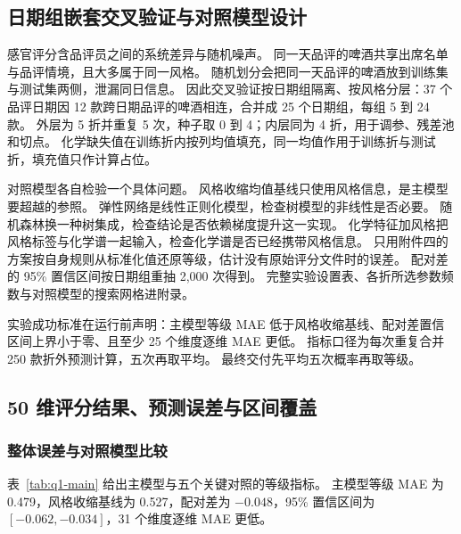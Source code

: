 \subsection{日期组嵌套交叉验证与对照模型设计}

感官评分含品评员之间的系统差异与随机噪声。
同一天品评的啤酒共享出席名单与品评情境，且大多属于同一风格。
随机划分会把同一天品评的啤酒放到训练集与测试集两侧，泄漏同日信息。
因此交叉验证按日期组隔离、按风格分层：37 个品评日期因 12 款跨日期品评的啤酒相连，合并成 25 个日期组，每组 5 到 24 款。
外层为 5 折并重复 5 次，种子取 0 到 4；内层同为 4 折，用于调参、残差池和切点。
化学缺失值在训练折内按列均值填充，同一均值作用于训练折与测试折，填充值只作计算占位。

对照模型各自检验一个具体问题。
风格收缩均值基线只使用风格信息，是主模型要超越的参照。
弹性网络是线性正则化模型，检查树模型的非线性是否必要。
随机森林换一种树集成，检查结论是否依赖梯度提升这一实现。
化学特征加风格把风格标签与化学谱一起输入，检查化学谱是否已经携带风格信息。
只用附件四的方案按自身规则从标准化值还原等级，估计没有原始评分文件时的误差。
配对差的 95\% 置信区间按日期组重抽 2,000 次得到。
完整实验设置表、各折所选参数频数与对照模型的搜索网格进附录。

实验成功标准在运行前声明：主模型等级 MAE 低于风格收缩基线、配对差置信区间上界小于零、且至少 25 个维度逐维 MAE 更低。
指标口径为每次重复合并 250 款折外预测计算，五次再取平均。
最终交付先平均五次概率再取等级。

\subsection{50 维评分结果、预测误差与区间覆盖}

\subsubsection{整体误差与对照模型比较}

表~\ref{tab:q1-main} 给出主模型与五个关键对照的等级指标。
主模型等级 MAE 为 0.479，风格收缩基线为 0.527，配对差为 $-0.048$，95\% 置信区间为 $[-0.062,-0.034]$，31 个维度逐维 MAE 更低。

